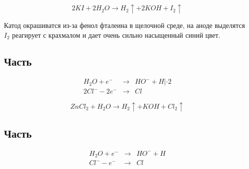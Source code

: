 \begin{equation}
    2KI + 2H_2O \to H_2\uparrow + 2KOH + I_2\uparrow
\end{equation}

Катод окрашиватся из-за фенол фталеина в щелочной среде,  
на аноде выделятся $I_2$ реагирует с крахмалом и дает очень 
сильно насыщенный синий цвет.

\subsection{Часть}
\begin{eqnarray}
    H_2O + e^- &\to&  HO^- + H | \cdot 2 \\
    2Cl^- - 2e^- &\to& Cl
\end{eqnarray}

\begin{equation}
    ZnCl_2 + H_2O \to H_2\uparrow + KOH + Cl_2\uparrow
\end{equation}

\subsection{Часть}

\begin{eqnarray}
    H_2O + e^- &\to&  HO^- + H \\
    Cl^- - e^- &\to& Cl  
\end{eqnarray}




